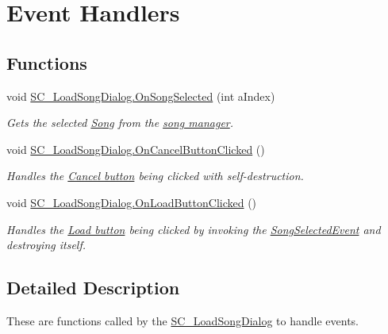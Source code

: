 \hypertarget{group___s_c___l_s_d_handlers}{}\section{Event Handlers}
\label{group___s_c___l_s_d_handlers}
\subsection*{Functions}
\begin{DoxyCompactItemize}
\item 
void \hyperlink{group___s_c___l_s_d_handlers_gacbe31698637339188fd50ba1a6723eab}{S\+C\+\_\+\+Load\+Song\+Dialog.\+On\+Song\+Selected} (int a\+Index)
\begin{DoxyCompactList}\small\item\em Gets the selected \hyperlink{class_song}{Song} from the \hyperlink{class_song_manager_class}{song manager}. \end{DoxyCompactList}\item 
void \hyperlink{group___s_c___l_s_d_handlers_gae393a24bbdd4fa1d2b45fa4199fb453a}{S\+C\+\_\+\+Load\+Song\+Dialog.\+On\+Cancel\+Button\+Clicked} ()
\begin{DoxyCompactList}\small\item\em Handles the \hyperlink{group___s_c___l_s_d_priv_var_ga31e17d7ca1cb32f0ad75ef8c7235873f}{Cancel button} being clicked with self-\/destruction. \end{DoxyCompactList}\item 
void \hyperlink{group___s_c___l_s_d_handlers_gad6ab852f2ac019395482e8c836061639}{S\+C\+\_\+\+Load\+Song\+Dialog.\+On\+Load\+Button\+Clicked} ()
\begin{DoxyCompactList}\small\item\em Handles the \hyperlink{group___s_c___l_s_d_priv_var_gaa27cfb6231ef826024dd063828efa364}{Load button} being clicked by invoking the \hyperlink{group___s_c___l_s_d_event_types_class_s_c___load_song_dialog_1_1_song_selected_event}{Song\+Selected\+Event} and destroying itself. \end{DoxyCompactList}\end{DoxyCompactItemize}


\subsection{Detailed Description}
These are functions called by the \hyperlink{class_s_c___load_song_dialog}{S\+C\+\_\+\+Load\+Song\+Dialog} to handle events. 

